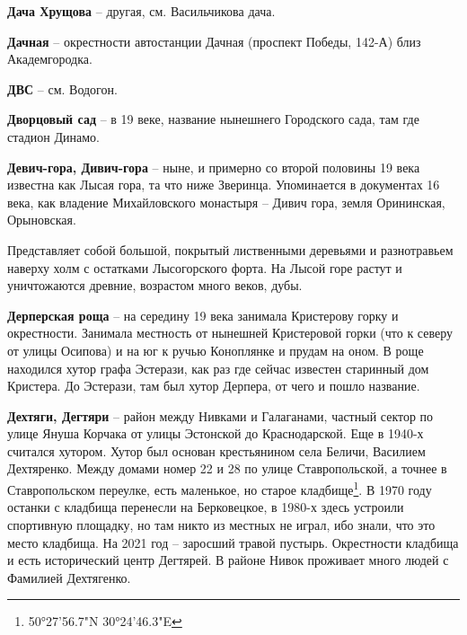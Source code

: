 \newpage

\textbf{Дача Хрущова} – другая, см. Васильчикова дача.\\

\medskip


\textbf{Дачная} – окрестности автостанции Дачная (проспект Победы, 142-А) близ Академгородка.\\

\medskip

\textbf{ДВС} – см. Водогон.\\

\medskip

\textbf{Дворцовый сад} – в 19 веке, название нынешнего Городского сада, там где стадион Динамо.\\

\medskip

\textbf{Девич-гора, Дивич-гора} – ныне, и примерно со второй половины 19 века известна как Лысая гора, та что ниже Зверинца. Упоминается в документах 16 века, как владение Михайловского монастыря – Дивич гора, земля Орининская, Орыновская.

Представляет собой большой, покрытый лис\-твенными деревьями и разнотравьем наверху холм с остатками Лысогорского форта. На Лысой горе растут и уничтожаются древние, возрастом много веков, дубы.\\

\medskip

\textbf{Дерперская роща} – на середину 19 века занимала Кристерову горку и окрестности. Занимала местность от нынешней Кристеровой горки (что к северу от улицы Осипова) и на юг к ручью Коноплянке и прудам на оном. В роще находился хутор графа Эстерази, как раз где сейчас известен старинный дом Кристера. До Эстерази, там был хутор Дерпера, от чего и пошло название.\\

\medskip

\textbf{Дехтяги, Дегтяри} – район между Нивками и Галаганами, частный сектор по улице Януша Корчака от улицы Эстонской до Краснодарской. Еще в 1940-х считался хутором. Хутор был основан крестьянином села Беличи, Василием Дехтяренко. Между домами номер 22 и 28 по улице Ставропольской, а точнее в Ставропольском переулке, есть маленькое, но старое кладбище\footnote{50°27'56.7"N 30°24'46.3"E}. В 1970 году останки с кладбища перенесли на Берковецкое, в 1980-х здесь устроили спортивную площадку, но там никто из местных не играл, ибо знали, что это место кладбища. На 2021 год – заросший травой пустырь. Окрестности кладбища и есть исторический центр Дегтярей. В районе Нивок проживает много людей с Фамилией Дехтягенко.\\

